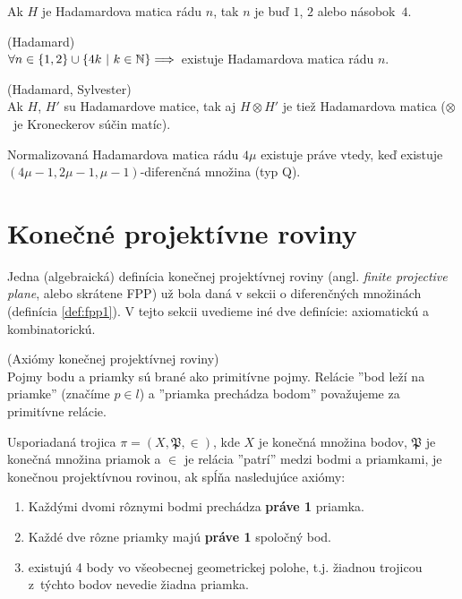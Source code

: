 \begin{theorem}
Ak $H$ je Hadamardova matica rádu $n$, tak $n$ je buď $1$, $2$ alebo násobok~$4$. 
\end{theorem}

\begin{hypothesis}{(Hadamard)}\\
$\forall n \in \left\{1, 2\right\} \cup \left\{4k ~|~ k \in \mathbb{N}\right\} \Longrightarrow$~existuje Hadamardova matica rádu $n$. 
\end{hypothesis}


\begin{theorem}{(Hadamard, Sylvester)}\\
Ak $H$, $H'$ su Hadamardove matice, tak aj $H \otimes H'$ je tiež Hadamardova matica ($\otimes$~je Kroneckerov súčin matíc).
\end{theorem}

\begin{theorem}
Normalizovaná Hadamardova matica rádu $4\mu$ existuje práve vtedy, keď existuje $(4\mu-1, 2\mu-1, \mu-1)$-diferenčná množina (typ Q). 
\end{theorem}

\section{Konečné projektívne roviny}

Jedna (algebraická) definícia konečnej projektívnej roviny (angl. \emph{finite projective plane}, alebo skrátene FPP) 
už bola daná v sekcii o diferenčných množinách (definícia \ref{def:fpp1}). V tejto sekcii uvedieme iné dve definície: 
axiomatickú a kombinatorickú.


\begin{definition}{(Axiómy konečnej projektívnej roviny)}\\
\label{def:fpp2}
Pojmy bodu a priamky sú brané ako primitívne pojmy. 
Relácie ''bod leží na priamke'' (značíme $p \in l$) a ''priamka prechádza bodom'' považujeme za primitívne relácie.

Usporiadaná trojica $\pi = (X, \mathfrak{P}, \in)$, kde $X$ je konečná množina bodov, $\mathfrak{P}$ je konečná množina priamok
a $\in$ je relácia ''patrí'' medzi bodmi a priamkami, je konečnou projektívnou rovinou, ak spĺňa nasledujúce axiómy:

\begin{enumerate}
    \item Každými dvomi rôznymi bodmi prechádza \textbf{práve 1} priamka.
    \item Každé dve rôzne priamky majú \textbf{práve 1} spoločný bod.
    \item existujú 4 body vo všeobecnej geometrickej polohe, t.j. žiadnou trojicou
    z~týchto bodov nevedie žiadna priamka.
\end{enumerate}
\end{definition}


